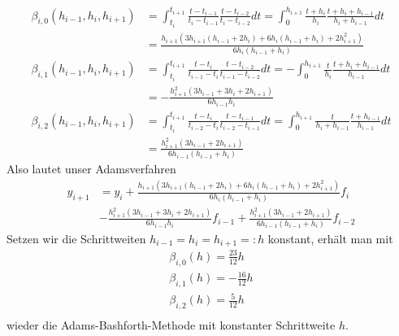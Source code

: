 \begin{solution}
\begin{align*}
  \beta_{i,0}(h_{i-1},h_i,h_{i+1}) &= \int_{t_i}^{t_{i + 1}}
  \frac{t - t_{i - 1}}{t_{i} - t_{i - 1}}\frac{t - t_{i - 2}}{t_{i} - t_{i - 2}}dt
  = \int_{0}^{h_{i+1}}
  \frac{t + h_i}{h_i}\frac{t + h_i + h_{i-1}}{h_i + h_{i-1}}dt \\
  &= \frac{h_{i+1}(3h_{i+1}(h_{i-1} + 2h_i) + 6h_i(h_{i-1} + h_i) + 2h_{i+1}^2)}{6h_i(h_{i-1} + h_i)}\\
  \beta_{i,1}(h_{i-1},h_i,h_{i+1}) &= \int_{t_i}^{t_{i + 1}}
  \frac{t - t_{i}}{t_{i - 1} - t_{i}}\frac{t - t_{i - 2}}{t_{i - 1} - t_{i - 2}}dt
  = -\int_{0}^{h_{i+1}}
  \frac{t}{h_i}\frac{t + h_i + h_{i-1}}{h_{i-1}}dt \\
  &= -\frac{h_{i+1}^2(3h_{i-1} + 3h_i + 2h_{i+1})}{6h_{i-1}h_i} \\
  \beta_{i,2}(h_{i-1},h_i,h_{i+1}) &= \int_{t_i}^{t_{i + 1}}
  \frac{t - t_{i}}{t_{i - 2} - t_{i}}\frac{t - t_{i - 1}}{t_{i-2} - t_{i - 1}}dt
  = \int_{0}^{h_{i+1}}
  \frac{t}{h_i + h_{i-1}}\frac{t + h_{i-1}}{h_{i-1}}dt\\
  &= \frac{h_{i+1}^2(3h_{i-1} + 2h_{i+1})}{6h_{i-1}(h_{i-1} + h_i)}
\end{align*}
Also lautet unser Adamsverfahren
\begin{align*}
  y_{i+1} &= y_i +
  \frac{h_{i+1}(3h_{i+1}(h_{i-1} + 2h_i) + 6h_i(h_{i-1} + h_i) + 2h_{i+1}^2)}{6h_i(h_{i-1} + h_i)}
  f_i \\
  &-\frac{h_{i+1}^2(3h_{i-1} + 3h_i + 2h_{i+1})}{6h_{i-1}h_i}f_{i-1} +
  \frac{h_{i+1}^2(3h_{i-1} + 2h_{i+1})}{6h_{i-1}(h_{i-1} + h_i)}f_{i-2}
\end{align*}
Setzen wir die Schrittweiten $h_{i-1} = h_i = h_{i+1} =: h$ konstant, erhält man mit
\begin{align*}
  \beta_{i,0}(h) = \frac{23}{12}h \\
  \beta_{i,1}(h) = -\frac{16}{12}h \\
  \beta_{i,2}(h) = \frac{5}{12}h \\
\end{align*}
wieder die Adams-Bashforth-Methode mit konstanter Schrittweite $h$.
\end{solution}
